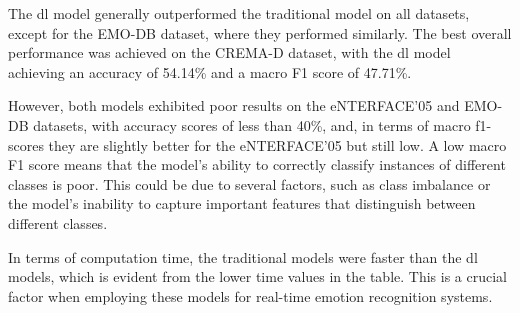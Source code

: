 \begin{table}[H]
	\centering
	\caption{Final models trained on \ac{iemo} and evaluated on different datasets.}
	\label{final_models}
\end{table}


The \ac{dl} model generally outperformed the traditional model on all datasets, except for the EMO-DB dataset, where they performed similarly. The best overall performance was achieved on the CREMA-D dataset, with the \ac{dl} model achieving an accuracy of 54.14\% and a macro F1 score of 47.71\%.

However, both models exhibited poor results on the eNTERFACE'05 and EMO-DB datasets, with accuracy scores of less than 40\%, and, in terms of macro f1-scores they are slightly better for the eNTERFACE'05 but still low. A low macro F1 score means that the model's ability to correctly classify instances of different classes is poor. This could be due to several factors, such as class imbalance or the model's inability to capture important features that distinguish between different classes.

In terms of computation time, the traditional models were faster than the \ac{dl} models, which is evident from the lower time values in the table. This is a crucial factor when employing these models for real-time emotion recognition systems.

